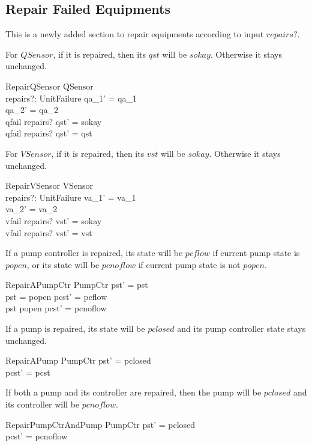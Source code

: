 \documentclass{report} %
\begin{document}
\subsection{Repair Failed Equipments}

This is a newly added section to repair equipments according to input $repairs?$. 

For $QSensor$, if it is repaired, then its $qst$ will be $sokay$. Otherwise it stays unchanged.
\begin{schema}{RepairQSensor}
  \Delta QSensor \\
  repairs?: \power UnitFailure
  \where
  qa\_1' = qa\_1 \\
  qa\_2' = qa\_2 \\
  qfail \in repairs? \implies qst' = sokay \\
  qfail \notin repairs? \implies qst' = qst
\end{schema}

For $VSensor$, if it is repaired, then its $vst$ will be $sokay$. Otherwise it stays unchanged.
\begin{schema}{RepairVSensor}
  \Delta VSensor \\
  repairs?: \power UnitFailure
  \where
  va\_1' = va\_1 \\
  va\_2' = va\_2 \\
  vfail \in repairs? \implies vst' = sokay \\
  vfail \notin repairs? \implies vst' = vst
\end{schema}

If a pump controller is repaired, its state will be $pcflow$ if current pump state is $popen$, or its state will be $pcnoflow$ if current pump state is not $popen$.
\begin{schema}{RepairAPumpCtr}
  \Delta PumpCtr
  \where
  pst' = pst \\
  pst = popen \implies pcst' = pcflow \\
  pst \neq popen \implies pcst' = pcnoflow
\end{schema}

If a pump is repaired, its state will be $pclosed$ and its pump controller state stays unchanged. 
\begin{schema}{RepairAPump}
  \Delta PumpCtr
  \where
  pst' = pclosed \\ %
  pcst' = pcst
\end{schema}

If both a pump and its controller are repaired, then the pump will be $pclosed$ and its controller will be $pcnoflow$.
\begin{schema}{RepairPumpCtrAndPump}
  \Delta PumpCtr
  \where
  pst' = pclosed \\
  pcst' = pcnoflow
\end{schema}
\end{document}
